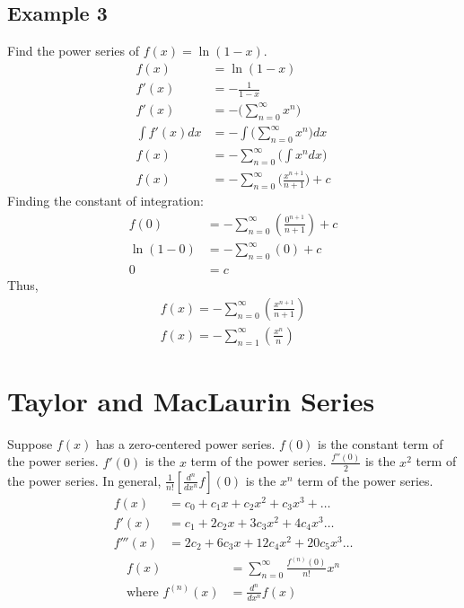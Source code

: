 \documentclass{article}
\theoremstyle{mytheoremstyle}
\theoremstyle{mytheoremstyle}
\theoremstyle{myproblemstyle}
\begin{document}
    \subsection*{Example 3}
    Find the power series of $f(x) = \ln(1-x)$.
    \begin{align*}
        f(x) &= \ln(1-x) \\
        f'(x) &= -\frac{1}{1-x} \\
        f'(x) &= -\Big(\sum_{n=0}^{\infty} x^n\Big) \\
        \int f'(x) dx &= -\int \Big(\sum_{n=0}^{\infty} x^n\Big) dx \\
        f(x) &= -\sum_{n=0}^{\infty} \Big(\int x^n dx\Big) \\
        f(x) &= -\sum_{n=0}^{\infty} \Big(\frac{x^{n+1}}{n+1}\Big) + c
    \end{align*}
    Finding the constant of integration:
    \begin{align*}
        f(0) &= -\sum_{n=0}^{\infty} (\frac{0^{n+1}}{n+1}) + c \\
        \ln(1-0) &= -\sum_{n=0}^{\infty} (0) + c \\
        0 &= c
    \end{align*}
    Thus,
    \begin{align*}
        f(x) = -\sum_{n=0}^{\infty} (\frac{x^{n+1}}{n+1}) \\
        f(x) = -\sum_{n=1}^{\infty} (\frac{x^{n}}{n})
    \end{align*}

    \section*{Taylor and MacLaurin Series}
    Suppose $f(x)$ has a zero-centered power series. $f(0)$ is the constant term
    of the power series. $f'(0)$ is the $x$ term of the power series.
    $\frac{f''(0)}{2}$ is the $x^2$ term of the power series. In general,
    $\frac{1}{n!} [\frac{d^n}{dx^n}f](0)$ is the $x^n$ term of the power series.
    \begin{align*}
        f(x) &= c_0 + c_1 x + c_2 x^2 + c_3 x^3 + \dots \\
        f'(x) &= c_1 + 2 c_2 x + 3 c_3 x^2 + 4 c_4 x^3 \dots \\
        f'''(x) &= 2 c_2 + 6 c_3 x + 12 c_4 x^2 + 20 c_5 x^3\dots
    \end{align*}
    \begin{align*}
        f(x) &= \sum_{n=0}^{\infty} \frac{f^{(n)}(0)}{n!} x^n \\
        \text{where } f^{(n)}(x) &= \frac{d^n}{dx^n} f(x)
    \end{align*}
\end{document}
